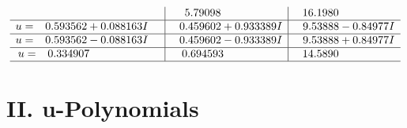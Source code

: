 \documentclass[1p]{elsarticle_modified}
\theoremstyle{definition}
\begin{document}
$$\begin{array}{c|c|c}
 & \phantom{-}5.79098\phantom{ +0.000000I} & \phantom{-}16.1980\phantom{ +0.000000I} \\ \hline\begin{aligned}
u &= \phantom{-}0.593562 + 0.088163 I\end{aligned}
 & \phantom{-}0.459602 + 0.933389 I & \phantom{-}9.53888 - 0.84977 I \\ \hline\begin{aligned}
u &= \phantom{-}0.593562 - 0.088163 I\end{aligned}
 & \phantom{-}0.459602 - 0.933389 I & \phantom{-}9.53888 + 0.84977 I \\ \hline\begin{aligned}
u &= \phantom{-}0.334907\phantom{ +0.000000I}\end{aligned}
 & \phantom{-}0.694593\phantom{ +0.000000I} & \phantom{-}14.5890\phantom{ +0.000000I}\\
 \hline 
 \end{array}$$\newpage
\newpage\renewcommand{\arraystretch}{1}
\centering \section*{ II. u-Polynomials}
\end{document}
